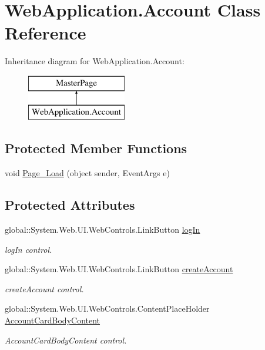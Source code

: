 \hypertarget{classWebApplication_1_1Account}{}\section{Web\+Application.\+Account Class Reference}
\label{classWebApplication_1_1Account}
Inheritance diagram for Web\+Application.\+Account\+:\begin{figure}[H]
\begin{center}
\leavevmode
\includegraphics[height=2.000000cm]{dd/db3/classWebApplication_1_1Account}
\end{center}
\end{figure}
\subsection*{Protected Member Functions}
\begin{DoxyCompactItemize}
\item 
void \mbox{\hyperlink{classWebApplication_1_1Account_ae857a22942da6ad8aaaa0022dd7a5c78}{Page\+\_\+\+Load}} (object sender, Event\+Args e)
\end{DoxyCompactItemize}
\subsection*{Protected Attributes}
\begin{DoxyCompactItemize}
\item 
global\+::\+System.\+Web.\+U\+I.\+Web\+Controls.\+Link\+Button \mbox{\hyperlink{classWebApplication_1_1Account_a4485ffbc1d54a9159accd84df022716b}{log\+In}}
\begin{DoxyCompactList}\small\item\em log\+In control. \end{DoxyCompactList}\item 
global\+::\+System.\+Web.\+U\+I.\+Web\+Controls.\+Link\+Button \mbox{\hyperlink{classWebApplication_1_1Account_ab798aa6d1c321cc04eb646dd29148bee}{create\+Account}}
\begin{DoxyCompactList}\small\item\em create\+Account control. \end{DoxyCompactList}\item 
global\+::\+System.\+Web.\+U\+I.\+Web\+Controls.\+Content\+Place\+Holder \mbox{\hyperlink{classWebApplication_1_1Account_ad4d7bdd1cdc63398539ccec0bac3b7fa}{Account\+Card\+Body\+Content}}
\begin{DoxyCompactList}\small\item\em Account\+Card\+Body\+Content control. \end{DoxyCompactList}\end{DoxyCompactItemize}


